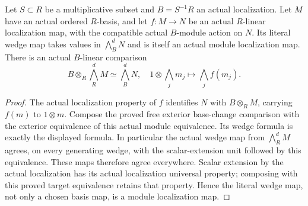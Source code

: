 \begin{theorem}
\label{sc0-canonical-port:ext:free-module-exterior-localization}
\leanok
Let \(S\subset R\) be a multiplicative subset and
\(B=S^{-1}R\) an actual localization. Let \(M\)
have an actual ordered \(R\)-basis, and let
\(f:M\to N\) be an actual \(R\)-linear localization
map, with the compatible actual \(B\)-module action
on \(N\). Its literal wedge map takes values in
\(\bigwedge_B^dN\) and is itself an actual module
localization map. There is an actual \(B\)-linear
comparison
\[
 B\otimes_R\bigwedge_R^dM\simeq\bigwedge_B^dN,
 \quad 1\otimes\bigwedge_jm_j\longmapsto\bigwedge_jf(m_j).
\]
\end{theorem}
\begin{proof}
The actual localization property of \(f\) identifies
\(N\) with \(B\otimes_RM\), carrying \(f(m)\)
to \(1\otimes m\). Compose the proved free exterior
base-change comparison with the exterior equivalence
of this actual module equivalence. Its wedge formula
is exactly the displayed formula. In particular the
actual wedge map from \(\bigwedge_R^dM\) agrees,
on every generating wedge, with the scalar-extension
unit followed by this equivalence. These maps therefore
agree everywhere. Scalar extension by the actual
localization has its actual localization universal
property; composing with this proved target equivalence
retains that property. Hence the literal wedge map,
not only a chosen basis map, is a module localization map.
\end{proof}

